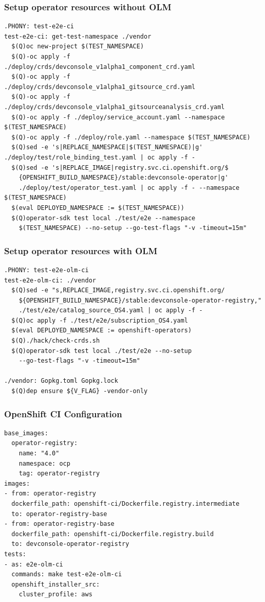 \documentclass[aspectratio=169]{beamer}
\begin{document}
\begin{frame}[fragile]
  \frametitle{Setup operator resources without OLM}

  \begin{Verbatim}[fontsize=\small]
.PHONY: test-e2e-ci
test-e2e-ci: get-test-namespace ./vendor
  $(Q)oc new-project $(TEST_NAMESPACE)
  $(Q)-oc apply -f ./deploy/crds/devconsole_v1alpha1_component_crd.yaml
  $(Q)-oc apply -f ./deploy/crds/devconsole_v1alpha1_gitsource_crd.yaml
  $(Q)-oc apply -f ./deploy/crds/devconsole_v1alpha1_gitsourceanalysis_crd.yaml
  $(Q)-oc apply -f ./deploy/service_account.yaml --namespace $(TEST_NAMESPACE)
  $(Q)-oc apply -f ./deploy/role.yaml --namespace $(TEST_NAMESPACE)
  $(Q)sed -e 's|REPLACE_NAMESPACE|$(TEST_NAMESPACE)|g' ./deploy/test/role_binding_test.yaml | oc apply -f -
  $(Q)sed -e 's|REPLACE_IMAGE|registry.svc.ci.openshift.org/$
    {OPENSHIFT_BUILD_NAMESPACE}/stable:devconsole-operator|g'
    ./deploy/test/operator_test.yaml | oc apply -f - --namespace $(TEST_NAMESPACE)
  $(eval DEPLOYED_NAMESPACE := $(TEST_NAMESPACE))
  $(Q)operator-sdk test local ./test/e2e --namespace
    $(TEST_NAMESPACE) --no-setup --go-test-flags "-v -timeout=15m"
  \end{Verbatim}
\end{frame}

\begin{frame}[fragile]
  \frametitle{Setup operator resources with OLM}

  \begin{Verbatim}[fontsize=\small]
.PHONY: test-e2e-olm-ci
test-e2e-olm-ci: ./vendor
  $(Q)sed -e "s,REPLACE_IMAGE,registry.svc.ci.openshift.org/
    ${OPENSHIFT_BUILD_NAMESPACE}/stable:devconsole-operator-registry,"
    ./test/e2e/catalog_source_OS4.yaml | oc apply -f -
  $(Q)oc apply -f ./test/e2e/subscription_OS4.yaml
  $(eval DEPLOYED_NAMESPACE := openshift-operators)
  $(Q)./hack/check-crds.sh
  $(Q)operator-sdk test local ./test/e2e --no-setup
    --go-test-flags "-v -timeout=15m"

./vendor: Gopkg.toml Gopkg.lock
  $(Q)dep ensure ${V_FLAG} -vendor-only
  \end{Verbatim}
\end{frame}

\begin{frame}[fragile]
  \frametitle{OpenShift CI Configuration}

  \begin{Verbatim}[fontsize=\small]
base_images:
  operator-registry:
    name: "4.0"
    namespace: ocp
    tag: operator-registry
images:
- from: operator-registry
  dockerfile_path: openshift-ci/Dockerfile.registry.intermediate
  to: operator-registry-base
- from: operator-registry-base
  dockerfile_path: openshift-ci/Dockerfile.registry.build
  to: devconsole-operator-registry
tests:
- as: e2e-olm-ci
  commands: make test-e2e-olm-ci
  openshift_installer_src:
    cluster_profile: aws
  \end{Verbatim}
\end{frame}
\end{document}
